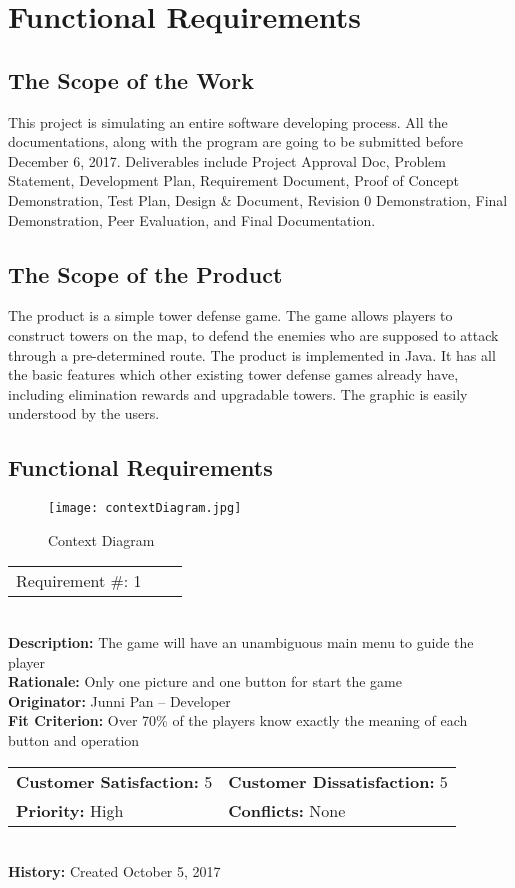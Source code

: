 \documentclass[12pt]{article}
\begin{document}
\section{Functional Requirements}
\subsection{The Scope of the Work}
This project is simulating an entire software developing process. All the documentations, along with the program are going to be submitted before December 6, 2017. Deliverables include Project Approval Doc, Problem Statement, Development Plan, Requirement Document, Proof of Concept Demonstration, Test Plan, Design \& Document,  Revision 0 Demonstration, Final Demonstration, Peer Evaluation, and Final Documentation.

\subsection{The Scope of the Product}
The product is a simple tower defense game. The game allows players to construct towers on the map, to defend the enemies who are supposed to attack through a pre-determined route. The product is implemented in Java. It has all the basic features which other existing tower defense games already have, including elimination rewards and upgradable towers. The graphic is easily understood by the users. 

\newpage
\subsection{Functional Requirements}

\begin{figure}[htp]
\centering
\texttt{[image: contextDiagram.jpg]}
\caption{Context Diagram}
\label{fig:contextDiagram}
\end{figure}

\begin{reqbox}
\begin{tabular}{ccc}Requirement \#: 1
\end{tabular} \\
\textbf{Description:} The game will have an unambiguous main menu to guide the player\\
\textbf{Rationale:} Only one picture and one button for start the game\\
\textbf{Originator:} Junni Pan -- Developer \\
\textbf{Fit Criterion:} Over 70\% of the players know exactly the meaning of each button and operation\\
\begin{tabular}{ll}
\textbf{Customer Satisfaction:} 5 & \textbf{Customer Dissatisfaction:} 5 \\
\textbf{Priority:} High & \textbf{Conflicts:} None\\
\end{tabular} \\
\textbf{History:} Created October 5, 2017
\end{reqbox}
\end{document}
